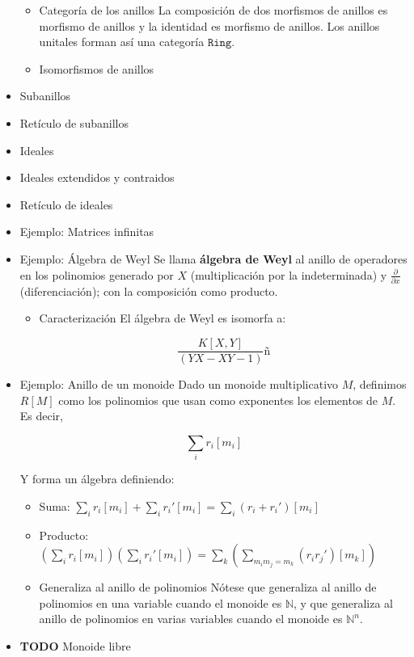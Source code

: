 \documentclass[11pt]{article}
\begin{document}
\begin{itemize}
\begin{itemize}
\item Categoría de los anillos
\label{sec-7-1-1-2-1}
La composición de dos morfismos de anillos es morfismo de anillos y
la identidad es morfismo de anillos. Los anillos unitales forman así
una categoría $\mathtt{Ring}$.

\item Isomorfismos de anillos
\label{sec-7-1-1-2-2}
\end{itemize}
\item Subanillos
\label{sec-7-1-1-3}
\item Retículo de subanillos
\label{sec-7-1-1-4}
\item Ideales
\label{sec-7-1-1-5}
\item Ideales extendidos y contraidos
\label{sec-7-1-1-6}
\item Retículo de ideales
\label{sec-7-1-1-7}
\item Ejemplo: Matrices infinitas
\label{sec-7-1-1-8}
\item Ejemplo: Álgebra de Weyl
\label{sec-7-1-1-9}
Se llama \textbf{álgebra de Weyl} al anillo de operadores en los polinomios
generado por $X$ (multiplicación por la indeterminada) y $\frac{\partial}{\partial x}$ (diferenciación);
con la composición como producto.

\begin{itemize}
\item Caracterización
\label{sec-7-1-1-9-1}
El álgebra de Weyl es isomorfa a:

\[
\frac{K[X,Y]}{(YX-XY-1)}ñ
\]
\end{itemize}

\item Ejemplo: Anillo de un monoide
\label{sec-7-1-1-10}
Dado un monoide multiplicativo $M$, definimos $R[M]$ como los polinomios que
usan como exponentes los elementos de $M$. Es decir,

\[
\sum_i r_i[m_i]
\]

Y forma un álgebra definiendo:

\begin{itemize}
\item Suma: $\sum_i r_i[m_i] + \sum_i r_i'[m_i] = \sum_i (r_i+r_i')[m_i]$
\item Producto: $\left(\sum_i r_i[m_i]\right)\left(\sum_i r_i'[m_i]\right) = \sum_k \left(\sum_{m_im_j=m_k} (r_ir_j')[m_k]\right)$
\end{itemize}

\begin{itemize}
\item Generaliza al anillo de polinomios
\label{sec-7-1-1-10-1}
Nótese que generaliza al anillo de polinomios en una variable cuando 
el monoide es $\mathbb{N}$, y que generaliza al anillo de polinomios en varias 
variables cuando el monoide es $\mathbb{N}^n$.
\end{itemize}

\item {\bfseries\sffamily TODO} Monoide libre
\label{sec-7-1-1-11}
\end{itemize}
\end{document}
